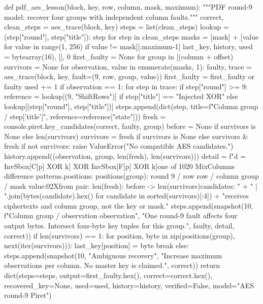 \begin{lightcode}[numbers=left,firstnumber=1]
def pdf_aes_lesson(block, key, row, column, mask, maximum):
    """PDF round-9 model: recover four groups with independent column faults."""
    correct, clean_steps = aes_trace(block, key)
    steps = list(clean_steps)
    lookup = {(step["round"], step["title"]): step for step in clean_steps}
    masks = [mask] + [value for value in range(1, 256) if value != mask][:maximum-1]
    last_key, history, used = bytearray(16), [], 0
    first_faulty = None
    for group in [(column + offset) %
        survivors = None
        for observation, value in enumerate(masks, 1):
            faulty, trace = aes_trace(block, key, fault=(9, row, group, value))
            first_faulty = first_faulty or faulty
            used += 1
            if observation == 1:
                for step in trace:
                    if step["round"] >= 9:
                        reference = lookup[(9, "ShiftRows")] if step["title"] == "Injected XOR" else lookup[(step["round"], step["title"])]
                        steps.append(dict(step, title=f"Column {group} / {step['title']}", reference=reference["state"]))
            fresh = console.piret.key_candidates(correct, faulty, group)
            before = None if survivors is None else len(survivors)
            survivors = fresh if survivors is None else survivors & fresh
            if not survivors:
                raise ValueError("No compatible AES candidates.")
            history.append((observation, group, len(fresh), len(survivors)))
            detail = f"d = InvSbox[C[p] XOR k] XOR InvSbox[F[p] XOR k]\nMatch one of 1020 MixColumns difference patterns.\nOutput positions: {positions(group)}\nSimulator: round 9 / row {row} / column {group} / mask {value:02X}\nCandidates from pair: {len(fresh)}\nIntersection: {before} -> {len(survivors)}\nFirst candidates: " + " | ".join(bytes(candidate).hex() for candidate in sorted(survivors)[:4]) + "\nSolver receives ciphertexts and column group, not the key or mask."
            steps.append(snapshot(10, f"Column {group} / observation {observation}", "One round-9 fault affects four output bytes. Intersect four-byte key tuples for this group.", faulty, detail, correct))
            if len(survivors) == 1:
                for position, byte in zip(positions(group), next(iter(survivors))):
                    last_key[position] = byte
                break
        else:
            steps.append(snapshot(10, "Ambiguous recovery", "Increase maximum observations per column. No master key is claimed.", correct))
            return dict(steps=steps, output=first_faulty.hex(), correct=correct.hex(), recovered_key=None, used=used, history=history, verified=False, model="AES round-9 Piret")

\end{lightcode}
